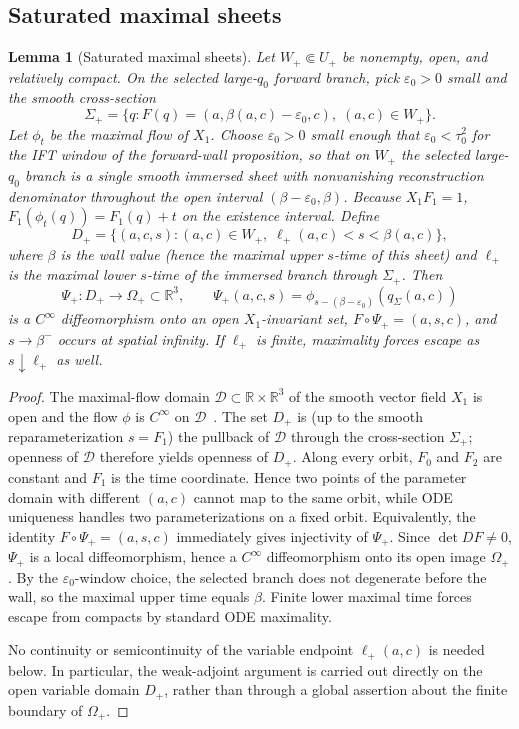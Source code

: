 ﻿\documentclass[11pt]{article}
\newtheorem{lemma}{Lemma}
\begin{document}
\subsection{Saturated maximal sheets}
\begin{lemma}[Saturated maximal sheets]
Let \(W_+\Subset U_+\) be nonempty, open, and relatively compact. On the selected large-\(q_0\) forward branch, pick \(\varepsilon_0>0\) small and the smooth cross-section
\[
\Sigma_+=\bigl\{q:F(q)=(a,\beta(a,c)-\varepsilon_0,c),\;(a,c)\in W_+\bigr\}.
\]
Let \(\phi_t\) be the maximal flow of \(X_1\). Choose \(\varepsilon_0>0\) small enough that \(\varepsilon_0<\tau_0^2\) for the IFT window of the forward-wall proposition, so that on \(W_+\) the selected large-\(q_0\) branch is a single smooth immersed sheet with nonvanishing reconstruction denominator throughout the open interval \((\beta-\varepsilon_0,\beta)\). Because \(X_1 F_1=1\), \(F_1(\phi_t(q))=F_1(q)+t\) on the existence interval. Define
\[
D_+=\bigl\{(a,c,s):(a,c)\in W_+,\;\ell_+(a,c)<s<\beta(a,c)\bigr\},
\]
where \(\beta\) is the wall value (hence the maximal upper \(s\)-time of this sheet) and \(\ell_+\) is the maximal lower \(s\)-time of the immersed branch through \(\Sigma_+\). Then
\[
\Psi_+:D_+\to\Omega_+\subset\mathbb{R}^3,
\qquad
\Psi_+(a,c,s)=\phi_{s-(\beta-\varepsilon_0)}(q_\Sigma(a,c))
\]
is a \(C^\infty\) diffeomorphism onto an open \(X_1\)-invariant set, \(F\circ\Psi_+=(a,s,c)\), and \(s\to\beta^-\) occurs at spatial infinity. If \(\ell_+\) is finite, maximality forces escape as \(s\downarrow\ell_+\) as well.
\end{lemma}
\begin{proof}
The maximal-flow domain \(\mathcal{D}\subset\mathbb{R}\times\mathbb{R}^3\) of the smooth vector field \(X_1\) is open and the flow \(\phi\) is \(C^\infty\) on \(\mathcal{D}\)~\cite{LeeSmooth}. The set \(D_+\) is (up to the smooth reparameterization \(s=F_1\)) the pullback of \(\mathcal{D}\) through the cross-section \(\Sigma_+\); openness of \(\mathcal{D}\) therefore yields openness of \(D_+\). Along every orbit, \(F_0\) and \(F_2\) are constant and \(F_1\) is the time coordinate. Hence two points of the parameter domain with different \((a,c)\) cannot map to the same orbit, while ODE uniqueness handles two parameterizations on a fixed orbit. Equivalently, the identity \(F\circ\Psi_+=(a,s,c)\) immediately gives injectivity of \(\Psi_+\). Since \(\det DF\neq 0\), \(\Psi_+\) is a local diffeomorphism, hence a \(C^\infty\) diffeomorphism onto its open image \(\Omega_+\). By the \(\varepsilon_0\)-window choice, the selected branch does not degenerate before the wall, so the maximal upper time equals \(\beta\). Finite lower maximal time forces escape from compacts by standard ODE maximality.

No continuity or semicontinuity of the variable endpoint
\(\ell_+(a,c)\) is needed below. In particular, the weak-adjoint argument is
carried out directly on the open variable domain \(D_+\), rather than through
a global assertion about the finite boundary of \(\Omega_+\).
\end{proof}
\end{document}
